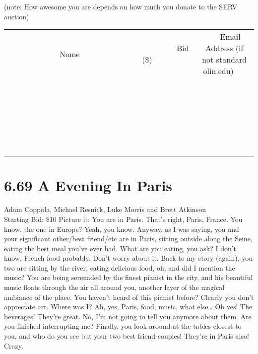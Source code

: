 \documentclass[11pt]{article}
\begin{document}
(note: How awesome you are depends on how much you donate to the SERV auction)
\\[6ex]
\begin{tabular}{c c c}
~~~~~~~~~~~~~Name~~~~~~~~~~~~~ & ~~~~~~~~~Bid (\$)~~~~~~~~~  & ~~~Email Address (if not standard olin.edu)~~~\\
 & & \\
\hline
 & & \\
\hline
 & & \\
\hline
 & & \\
\hline
 & & \\
\hline
 & & \\
\hline
 & & \\
\hline
 & & \\
\hline
 & & \\
\hline
 & & \\
\hline
 & & \\
\hline
 & & \\
\hline
 & & \\
\hline
 & & \\
\hline
 & & \\
\hline
 & & \\
\hline
 & & \\
\hline
 & & \\
\hline
 & & \\
\hline
 & & \\
\hline
 & & \\
\hline
 & & \\
\hline
 & & \\
\hline
 & & \\
\hline
 & & \\
\hline
 & & \\
\hline
\end{tabular}
\newpage
\section*{6.69 A Evening In Paris}
Adam Coppola, Michael Resnick, Luke Morris and Brett Atkinson
\\
Starting Bid: \$10
\newline
Picture it: You are in Paris. That’s right, Paris, France. You know, the one in Europe? Yeah, you know. Anyway, as I was saying, you and your significant other/best friend/etc are in Paris, sitting outside along the Seine, eating the best meal you've ever had. What are you eating, you ask? I don’t know, French food probably. Don’t worry about it. Back to my story (again), you two are sitting by the river, eating delicious food, oh, and did I mention the music? You are being serenaded by the finest pianist in the city, and his beautiful music floats through the air all around you, another layer of the magical ambiance of the place. You haven’t heard of this pianist before? Clearly you don’t appreciate art. Where was I? Ah, yes, Paris, food, music, what else… Oh yes! The beverages! They’re great. No, I’m not going to tell you anymore about them. Are you finished interrupting me? Finally, you look around at the tables closest to you, and who do you see but your two best friend-couples! They’re in Paris also! Crazy. 
 
\end{document}

